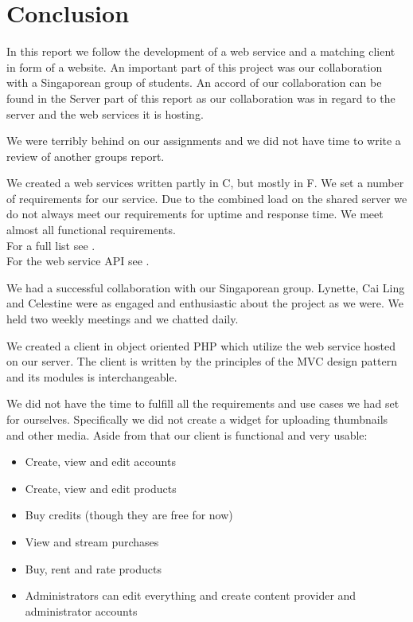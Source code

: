 \section{Conclusion}
In this report we follow the development of a web service and a matching client in form of a website. An important part of this project was our collaboration with a Singaporean group of students. An accord of our collaboration can be found in the Server part of this report as our collaboration was in regard to the server and the web services it is hosting.

We were terribly behind on our assignments and we did not have time to write a review of another groups report.

We created a web services written partly in C\Sh, but mostly in F\Sh. We set a number of requirements for our service. Due to the combined load on the shared server we do not always meet our requirements for uptime and response time. We meet almost all functional requirements. 
\\For a full list see .
\\For the web service API see .

We had a successful collaboration with our Singaporean group. Lynette, Cai Ling and Celestine were as engaged and enthusiastic about the project as we were. We held two weekly meetings and we chatted daily.

We created a client in object oriented PHP which utilize the web service hosted on our server. The client is written by the principles of the MVC design pattern and its modules is interchangeable.

We did not have the time to fulfill all the requirements and use cases we had set for ourselves. Specifically we did not create a widget for uploading thumbnails and other media. Aside from that our client is functional and very usable:
\begin{itemize}
\item Create, view and edit accounts
\item Create, view and edit products
\item Buy credits (though they are free for now)
\item View and stream purchases
\item Buy, rent and rate products
\item Administrators can edit everything and create content provider and administrator accounts
\end{itemize}


